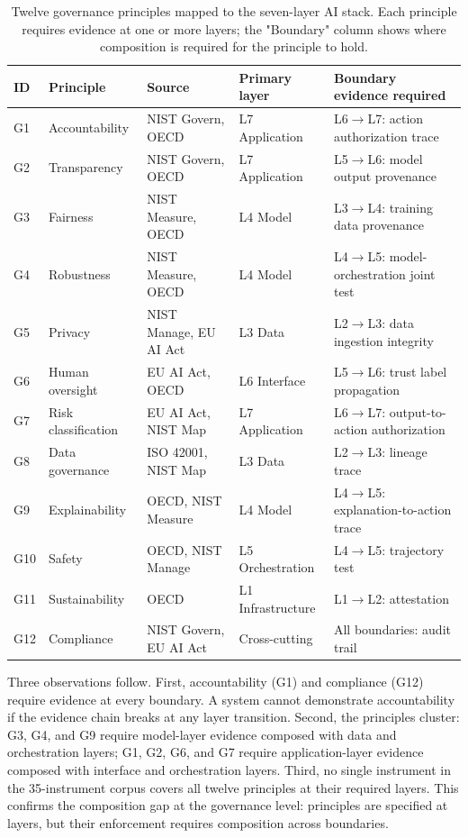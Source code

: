 \documentclass[runningheads]{llncs}
\begin{document}
\begin{table}[t]
\caption{Twelve governance principles mapped to the seven-layer AI stack. Each principle requires evidence at one or more layers; the "Boundary" column shows where composition is required for the principle to hold.}
\label{tab:principles}
\centering
\small
\begin{tabular}{@{}p{1.5cm}p{2.8cm}p{1.8cm}p{2.5cm}p{2.8cm}@{}}
\toprule
\textbf{ID} & \textbf{Principle} & \textbf{Source} & \textbf{Primary layer} & \textbf{Boundary evidence required}\\
\midrule
G1 & Accountability & NIST Govern, OECD & L7 Application & L6$\rightarrow$L7: action authorization trace\\
G2 & Transparency & NIST Govern, OECD & L7 Application & L5$\rightarrow$L6: model output provenance\\
G3 & Fairness & NIST Measure, OECD & L4 Model & L3$\rightarrow$L4: training data provenance\\
G4 & Robustness & NIST Measure, OECD & L4 Model & L4$\rightarrow$L5: model-orchestration joint test\\
G5 & Privacy & NIST Manage, EU AI Act & L3 Data & L2$\rightarrow$L3: data ingestion integrity\\
G6 & Human oversight & EU AI Act, OECD & L6 Interface & L5$\rightarrow$L6: trust label propagation\\
G7 & Risk classification & EU AI Act, NIST Map & L7 Application & L6$\rightarrow$L7: output-to-action authorization\\
G8 & Data governance & ISO 42001, NIST Map & L3 Data & L2$\rightarrow$L3: lineage trace\\
G9 & Explainability & OECD, NIST Measure & L4 Model & L4$\rightarrow$L5: explanation-to-action trace\\
G10 & Safety & OECD, NIST Manage & L5 Orchestration & L4$\rightarrow$L5: trajectory test\\
G11 & Sustainability & OECD & L1 Infrastructure & L1$\rightarrow$L2: attestation\\
G12 & Compliance & NIST Govern, EU AI Act & Cross-cutting & All boundaries: audit trail\\
\bottomrule
\end{tabular}
\end{table}

Three observations follow. First, accountability (G1) and compliance (G12) require evidence at every boundary. A system cannot demonstrate accountability if the evidence chain breaks at any layer transition. Second, the principles cluster: G3, G4, and G9 require model-layer evidence composed with data and orchestration layers; G1, G2, G6, and G7 require application-layer evidence composed with interface and orchestration layers. Third, no single instrument in the 35-instrument corpus covers all twelve principles at their required layers. This confirms the composition gap at the governance level: principles are specified at layers, but their enforcement requires composition across boundaries.
\end{document}
